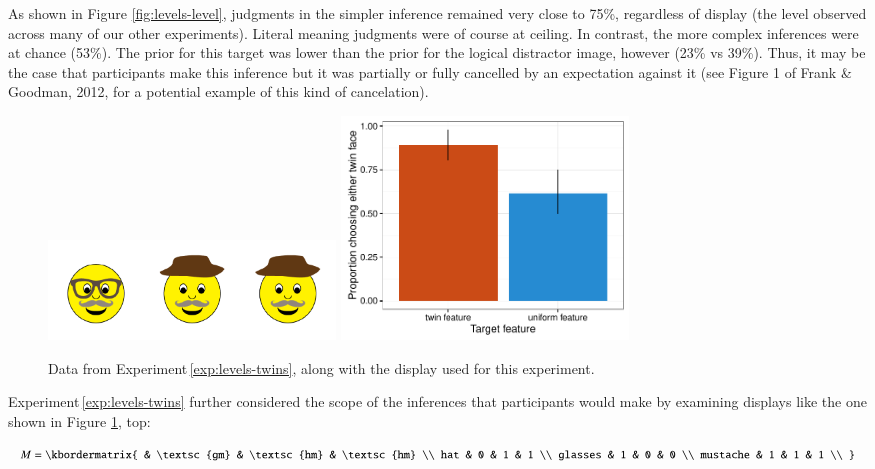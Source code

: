 \documentclass[man,noapacite]{apa2}
\newcounter{Experiment}
\newcommand{\exptref}[1]{Experiment\,\ref{#1}}
\begin{document}
As shown in Figure \ref{fig:levels-level}, judgments in the simpler inference remained very close to 75\%, regardless of display (the level observed across many of our other experiments). Literal meaning judgments were of course at ceiling. In contrast, the more complex inferences were at chance (53\%). The prior for this target was lower than the prior for the logical distractor image, however (23\% vs 39\%). Thus, it may be the case that participants make this inference but it was partially or fully cancelled  by an expectation against it (see Figure 1 of Frank \& Goodman, 2012, for a potential example of this kind of cancelation).

 \begin{figure}[t]
  \centering
  \includegraphics[width=3in]{figures/levels-twins-stim.pdf}
  \includegraphics[width=3in]{../plots/3-levels-twins.pdf}
  \caption{\label{fig:levels-twins} Data from \exptref{exp:levels-twins}, along with the display used for this experiment.}
\end{figure}

\exptref{exp:levels-twins} further considered the scope of the inferences that participants would make by examining displays like the one shown in Figure \ref{fig:levels-twins}, top:

\begin{equation}
    M = \kbordermatrix{
               & \textsc{gm} & \textsc{hm} & \textsc{hm} \\
      hat      & 0  & 1  & 1  \\
      glasses  & 1  & 0  & 0 \\
      mustache & 1  & 1  & 1 \\
    }
\end{equation}
\end{document}
